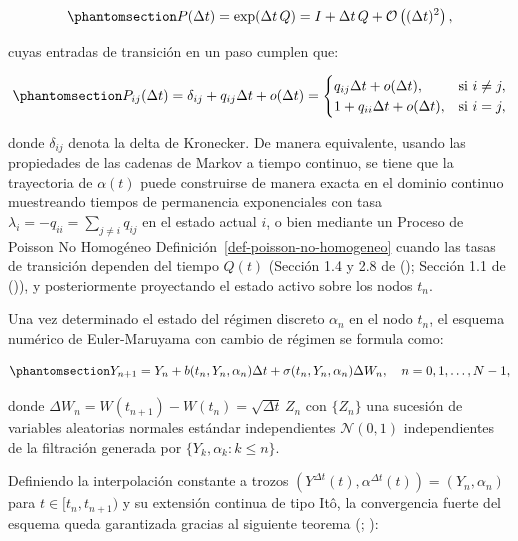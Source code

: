\documentclass[
  spanish,
  us-letterpaper,
]{scrreprt}
\numberwithin{equation}{section}
\theoremstyle{plain}
\theoremstyle{plain}
\theoremstyle{plain}
\theoremstyle{definition}
\theoremstyle{remark}
\begin{document}
\begin{equation}\phantomsection\label{eq-matriz-transicion-discreta}{
P(\Delta t) = \exp(\Delta t \, Q) = I + \Delta t \, Q + \mathcal{O}\left((\Delta t)^2\right),
}\end{equation}

cuyas entradas de transición en un paso cumplen que:

\begin{equation}\phantomsection\label{eq-prob-transicion-paso}{
P_{ij}(\Delta t) = \delta_{ij} + q_{ij}\Delta t + o(\Delta t) = 
\begin{cases} 
q_{ij}\Delta t + o(\Delta t), & \text{si } i \neq j, \\ 
1 + q_{ii}\Delta t + o(\Delta t), & \text{si } i = j,
\end{cases}
}\end{equation}

donde \(\delta_{ij}\) denota la delta de Kronecker. De manera
equivalente, usando las propiedades de las cadenas de Markov a tiempo
continuo, se tiene que la trayectoria de \(\alpha(t)\) puede construirse
de manera exacta en el dominio continuo muestreando tiempos de
permanencia exponenciales con tasa
\(\displaystyle \lambda_i = -q_{ii} = \sum_{j \neq i} q_{ij}\) en el
estado actual \(i\), o bien mediante un Proceso de Poisson No Homogéneo
Definición~\ref{def-poisson-no-homogeneo} cuando las tasas de transición
dependen del tiempo \(Q(t)\) (Sección 1.4 y 2.8 de
(); Sección 1.1 de
()), y
posteriormente proyectando el estado activo sobre los nodos \(t_n\).

Una vez determinado el estado del régimen discreto \(\alpha_n\) en el
nodo \(t_n\), el esquema numérico de Euler-Maruyama con cambio de
régimen se formula como:

\begin{equation}\phantomsection\label{eq-esquema-em-switching}{
Y_{n+1} = Y_n + b(t_n, Y_n, \alpha_n)\Delta t + \sigma(t_n, Y_n, \alpha_n)\Delta W_n, \quad n = 0, 1, \dots, N - 1,
}\end{equation}

donde \(\Delta W_n = W(t_{n+1}) - W(t_n) = \sqrt{\Delta t}\, Z_n\) con
\(\{Z_n\}\) una sucesión de variables aleatorias normales estándar
independientes \(\mathcal{N}(0, 1)\) independientes de la filtración
generada por \(\{Y_k, \alpha_k : k \le n\}\).

Definiendo la interpolación constante a trozos
\((Y^{\Delta t}(t), \alpha^{\Delta t}(t)) = (Y_n, \alpha_n)\) para
\(t \in [t_n, t_{n+1})\) y su extensión continua de tipo Itô, la
convergencia fuerte del esquema queda garantizada gracias al siguiente
teorema (;
):
\end{document}
